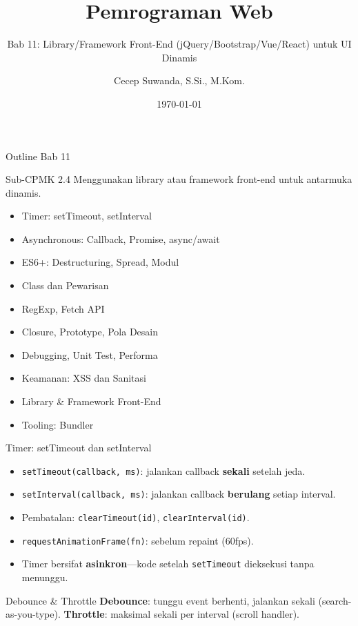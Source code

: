\documentclass[handout]{beamer}
\title[Bab 11 -- Library/Framework]{Pemrograman Web}
\subtitle{Bab 11: Library/Framework Front-End (jQuery/Bootstrap/Vue/React) untuk UI Dinamis}
\author{Cecep Suwanda, S.Si., M.Kom.}
\institute{Universitas Bale Bandung}
\date{\today}
\begin{document}
\begin{frame}
	\titlepage
\end{frame}

\begin{frame}[shrink=15]{Outline Bab 11}
	\begin{block}{Sub-CPMK 2.4}
		Menggunakan library atau framework front-end untuk antarmuka dinamis.
	\end{block}
	\begin{itemize}
		\item Timer: setTimeout, setInterval
		\item Asynchronous: Callback, Promise, async/await
		\item ES6+: Destructuring, Spread, Modul
		\item Class dan Pewarisan
		\item RegExp, Fetch API
		\item Closure, Prototype, Pola Desain
		\item Debugging, Unit Test, Performa
		\item Keamanan: XSS dan Sanitasi
		\item Library \& Framework Front-End
		\item Tooling: Bundler
	\end{itemize}
\end{frame}

\begin{frame}{Timer: setTimeout dan setInterval}
	\begin{itemize}
		\item \texttt{setTimeout(callback, ms)}: jalankan callback \textbf{sekali} setelah jeda.
		\item \texttt{setInterval(callback, ms)}: jalankan callback \textbf{berulang} setiap interval.
		\item Pembatalan: \texttt{clearTimeout(id)}, \texttt{clearInterval(id)}.
		\item \texttt{requestAnimationFrame(fn)}: sebelum repaint (60fps).
		\item Timer bersifat \textbf{asinkron}---kode setelah \texttt{setTimeout} dieksekusi tanpa menunggu.
	\end{itemize}
	\begin{block}{Debounce \& Throttle}
		\textbf{Debounce}: tunggu event berhenti, jalankan sekali (search-as-you-type). \textbf{Throttle}: maksimal sekali per interval (scroll handler).
	\end{block}
\end{frame}
\end{document}
